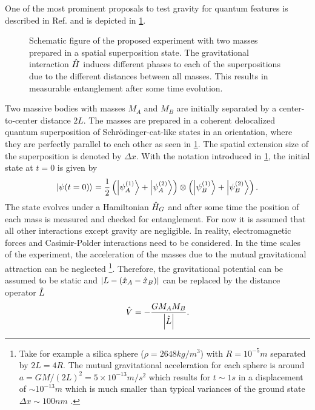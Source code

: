 One of the most prominent proposals to test gravity for quantum features is described in Ref. \cite{Bose_2017} and is depicted in \cref{fig:2:simple-problem}.
\begin{figure}[!htbp]
  \centering
  \def\svgwidth{\textwidth}
  
  \caption{Schematic figure of the proposed experiment with two masses prepared in a spatial superposition state. The gravitational interaction $\hat{H}$ induces different phases to each of the superpositions due to the different distances between all masses. This results in measurable entanglement after some time evolution.}
  \label{fig:2:simple-problem}
\end{figure}
Two massive bodies with masses $M_A$ and $M_B$ are initially separated by a center-to-center distance $2L$. 
The masses are prepared in a coherent delocalized quantum superposition of Schrödinger-cat-like states in an orientation, where they are perfectly parallel to each other as seen in \cref{fig:2:simple-problem}.
The spatial extension size of the superposition is denoted by $\Delta x$.
With the notation introduced in \cref{fig:2:simple-problem}, the initial state at $t=0$ is given by
\begin{equation}\label{eq:2:initial-state}
  \ket{\psi(t=0)} = \frac{1}{2}\left( \ket{\psi_A^{(1)}} + \ket{\psi_A^{(2)}} \right) \otimes \left( \ket{\psi_B^{(1)}} + \ket{\psi_B^{(2)}} \right) .
\end{equation}
The state evolves under a Hamiltonian $\hat{H}_G$ and after some time the position of each mass is measured and checked for entanglement.
For now it is assumed that all other interactions except gravity are negligible. In reality, electromagnetic forces and Casimir-Polder interactions \cite{Casimir_1948, Casimir_1948a} need to be considered.
In the time scales of the experiment, the acceleration of the masses due to the mutual gravitational attraction can be neglected \footnote{Take for example a silica sphere ($\rho = 2648 \si{kg/m^3}$) with $R=10^{-5}\si{m}$ separated by $2L=4R$. The mutual gravitational acceleration for each sphere is around $a=GM/(2L)^2 = 5 \times 10^{-13}\si{m/s^2}$ which results for $t\sim 1 \si{s}$ in a displacement of $\sim 10^{-13}\si{m}$ which is much smaller than typical variances of the ground state $\Delta x \sim 100\si{nm}$ \cite{Fein_2019}.}.
Therefore, the gravitational potential can be assumed to be static and $\left\lvert L-(\hat{x}_A - \hat{x}_B)\right\rvert$ can be replaced by the distance operator $\hat{L}$
\begin{equation}\label{eq:2:newtonian-potential}
  \hat{V} = -\frac{G M_A M_B}{\left\lvert\hat{L}\right\rvert} .
\end{equation}
